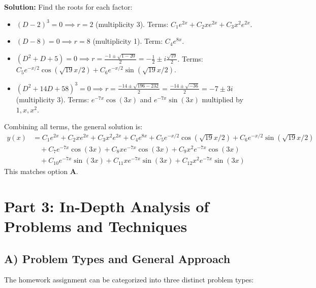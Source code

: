 \documentclass[11pt, a4paper]{article}
\theoremstyle{definition}
\theoremstyle{remark}
\begin{document}
\textbf{Solution:}
Find the roots for each factor:
\begin{itemize}
    \item $(D-2)^3 = 0 \implies r = 2$ (multiplicity 3). Terms: $C_1 e^{2x} + C_2 x e^{2x} + C_3 x^2 e^{2x}$.
    \item $(D-8) = 0 \implies r = 8$ (multiplicity 1). Term: $C_4 e^{8x}$.
    \item $(D^2+D+5) = 0 \implies r = \frac{-1 \pm \sqrt{1 - 20}}{2} = -\frac{1}{2} \pm i\frac{\sqrt{19}}{2}$. Terms: $C_5 e^{-x/2} \cos(\sqrt{19}x/2) + C_6 e^{-x/2} \sin(\sqrt{19}x/2)$.
    \item $(D^2+14D+58)^3 = 0 \implies r = \frac{-14 \pm \sqrt{196 - 232}}{2} = \frac{-14 \pm \sqrt{-36}}{2} = -7 \pm 3i$ (multiplicity 3). Terms: $e^{-7x} \cos(3x)$ and $e^{-7x} \sin(3x)$ multiplied by $1, x, x^2$.
\end{itemize}
Combining all terms, the general solution is:
\begin{align*}
    y(x) &= C_1 e^{2x} + C_2 x e^{2x} + C_3 x^2 e^{2x} + C_4 e^{8x} + C_5 e^{-x/2} \cos(\sqrt{19}x/2) + C_6 e^{-x/2} \sin(\sqrt{19}x/2) \\
    &\quad + C_7 e^{-7x} \cos(3x) + C_8 x e^{-7x} \cos(3x) + C_9 x^2 e^{-7x} \cos(3x) \\
    &\quad + C_{10} e^{-7x} \sin(3x) + C_{11} x e^{-7x} \sin(3x) + C_{12} x^2 e^{-7x} \sin(3x)
\end{align*}
This matches option \textbf{A}.

\newpage
\section{Part 3: In-Depth Analysis of Problems and Techniques}

\subsection{A) Problem Types and General Approach}
The homework assignment can be categorized into three distinct problem types:
\end{document}
